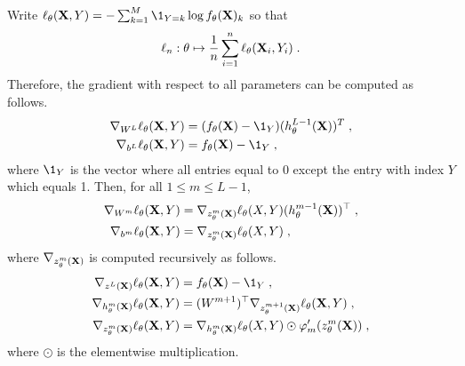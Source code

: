 \begin{shaded}
\begin{proposition}
\label{prop:backpropagation:classif}
Write $\ell_{\theta}(\bX,Y) =  -\sum_{k=1}^{M} \1_{Y=k}\log f_{\theta}(\bX)_k$ so that 
$$
\ell_n:\theta \mapsto \frac{1}{n} \sum_{i=1}^n \ell_{\theta}(\mathbf{X}_i,Y_i)\;. 
$$
Therefore, the gradient with respect to all parameters can be computed as follows.
\begin{align*}
\nabla_{W^L} \ell_{\theta}(\bX,Y) &= (f_{\theta}(\bX) - \1_Y)(h_{\theta}^{L-1}(\bX))^T\eqsp,\\
\nabla_{b^L} \ell_{\theta}(\bX,Y) &= f_{\theta}(\bX) - \1_Y\eqsp,
\end{align*}
where $\1_Y$ is the vector where all entries equal to 0 except the entry with index $Y$ which equals 1. Then, for all $1\leqslant m\leqslant L-1$,
\begin{align*}
\nabla_{W^m} \ell_{\theta}(\mathbf{X},Y) &= \nabla_{z_{\theta}^m(\mathbf{X})}\ell_{\theta}(X,Y)(h_{\theta}^{m-1}(\mathbf{X}))^\top\;,\\
\nabla_{b^m} \ell_{\theta}(\mathbf{X},Y) &=  \nabla_{z_{\theta}^m(\mathbf{X})}\ell_{\theta}(X,Y)\;,
\end{align*}
where $\nabla_{z_{\theta}^m(\mathbf{X})}$ is computed recursively as follows.
\begin{align*}
\nabla_{z^L(\bX)} \ell_{\theta}(\bX,Y) &= f_{\theta}(\bX) - \1_Y\eqsp,\\
\nabla_{h_{\theta}^m(\bX)} \ell_{\theta}(\bX,Y) &= (W^{m+1})^\top\nabla_{z_{\theta}^{m+1}(\bX)} \ell_{\theta}(\bX,Y) \eqsp,\\
\nabla_{z_{\theta}^m(\bX)} \ell_{\theta}(\bX,Y) &= \nabla_{h_{\theta}^m(\bX)}\ell_{\theta}(X,Y) \odot \varphi_m'(z_{\theta}^{m}(\bX))\eqsp,
\end{align*}
where $\odot$ is the elementwise multiplication.
\end{proposition}
\end{shaded}
